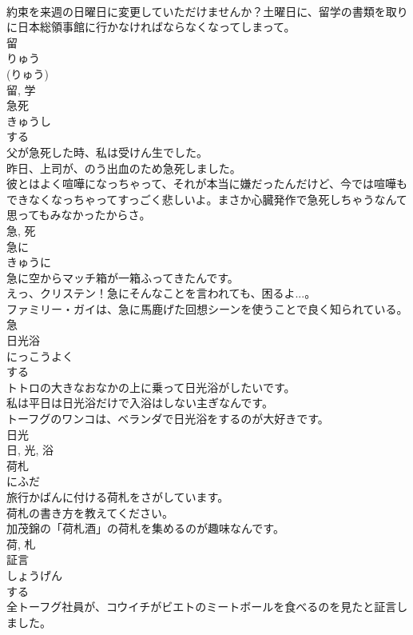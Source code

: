 \documentclass[8pt]{extreport}
\begin{document}
\begin{CJK}{UTF8}{min}
\\	約束を来週の日曜日に変更していただけませんか？土曜日に、留学の書類を取りに日本総領事館に行かなければならなくなってしまって。	
\\	留 
\\	りゅう 
\\	(りゅう) 
\\	留, 学	
\\	急死	
\\	きゅうし	
\\	する 
\\	父が急死した時、私は受けん生でした。	
\\	昨日、上司が、のう出血のため急死しました。	
\\	彼とはよく喧嘩になっちゃって、それが本当に嫌だったんだけど、今では喧嘩もできなくなっちゃってすっごく悲しいよ。まさか心臓発作で急死しちゃうなんて思ってもみなかったからさ。	
\\	急, 死	
\\	急に	
\\	きゅうに	
\\	急に空からマッチ箱が一箱ふってきたんです。	
\\	えっ、クリステン！急にそんなことを言われても、困るよ...。	
\\	ファミリー・ガイは、急に馬鹿げた回想シーンを使うことで良く知られている。	
\\	急	
\\	日光浴	
\\	にっこうよく	
\\	する 
\\	トトロの大きなおなかの上に乗って日光浴がしたいです。	
\\	私は平日は日光浴だけで入浴はしない主ぎなんです。	
\\	トーフグのワンコは、ベランダで日光浴をするのが大好きです。	
\\	日光 
\\	日, 光, 浴	
\\	荷札	
\\	にふだ	
\\	旅行かばんに付ける荷札をさがしています。	
\\	荷札の書き方を教えてください。	
\\	加茂錦の「荷札酒」の荷札を集めるのが趣味なんです。	
\\	荷, 札	
\\	証言	
\\	しょうげん	
\\	する 
\\	全トーフグ社員が、コウイチがビエトのミートボールを食べるのを見たと証言しました。	

\end{CJK}
\end{document}
